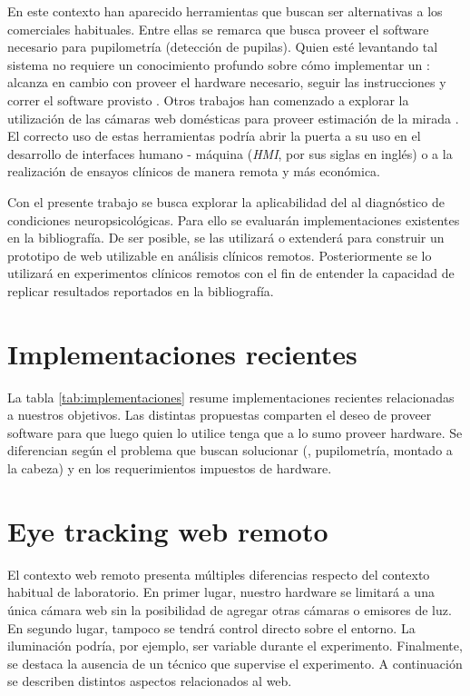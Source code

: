 En este contexto han aparecido herramientas que buscan ser alternativas a los
\eyetrackers comerciales habituales.
Entre ellas se remarca \pupilext que busca proveer el software necesario para
pupilometría (detección de pupilas).
Quien esté levantando tal sistema no requiere un conocimiento profundo sobre
cómo implementar un \eyetracker: alcanza en cambio con proveer el hardware
necesario, seguir las instrucciones y correr el software provisto
\cite{zandi_2021_pupilext}.
Otros trabajos han comenzado a explorar la utilización de las cámaras web
domésticas para proveer estimación de la mirada \cite{xu_2015_turker_gaze,
papoutsaki_2016_webgazer, huang_2016_pace}.
El correcto uso de estas herramientas podría abrir la puerta a su uso en el
desarrollo de interfaces humano - máquina (\textit{HMI}, por sus siglas en inglés) o a la realización de ensayos
clínicos de manera remota y más económica.

Con el presente trabajo se busca explorar la aplicabilidad del \eyetracking
\online al diagnóstico de condiciones neuropsicológicas.
Para ello se evaluarán implementaciones existentes en la bibliografía.
De ser posible, se las utilizará o extenderá para construir un prototipo de
\eyetracker web utilizable en análisis clínicos remotos.
Posteriormente se lo utilizará en experimentos clínicos remotos con el fin de
entender la capacidad de replicar resultados reportados en la bibliografía.

\section{Implementaciones recientes}

La tabla \ref{tab:implementaciones} resume implementaciones recientes relacionadas
a nuestros objetivos.
Las distintas propuestas comparten el deseo de proveer software para que luego
quien lo utilice tenga que a lo sumo proveer hardware.
Se diferencian según el problema que buscan solucionar (\eg, pupilometría,
\eyetracking montado a la cabeza) y en los requerimientos impuestos de
hardware.



\section{Eye tracking web remoto}

El contexto web remoto presenta múltiples diferencias respecto del contexto
habitual de laboratorio.
En primer lugar, nuestro hardware se limitará a una única cámara web sin la
posibilidad de agregar otras cámaras o emisores de luz.
En segundo lugar, tampoco se tendrá control directo sobre el entorno.
La iluminación podría, por ejemplo, ser variable durante el experimento.
Finalmente, se destaca la ausencia de un técnico que supervise el experimento.
A continuación se describen distintos aspectos relacionados al \eyetracking web.

